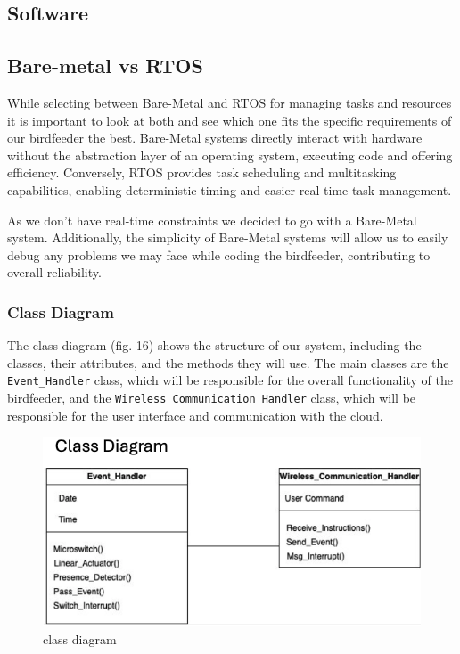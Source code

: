 \documentclass[12pt,a4paper]{article}
\begin{document}
\subsection{Software}
\subsection{Bare-metal vs RTOS}
While selecting between Bare-Metal and RTOS for managing tasks and resources it is important to look at both and see which one fits the specific requirements of our birdfeeder the best. Bare-Metal systems directly interact with hardware without the abstraction layer of an operating system, executing code and offering efficiency. Conversely, RTOS provides task scheduling and multitasking capabilities, enabling deterministic timing and easier real-time task management. 

As we don't have real-time constraints we decided to go with a Bare-Metal system. Additionally, the simplicity of Bare-Metal systems will allow us to easily debug any problems we may face while coding the birdfeeder, contributing to overall reliability. 
\subsubsection{Class Diagram}

The class diagram (fig. 16) shows the structure of our system, including the classes, their attributes, and the methods they will use. The main classes are the \texttt{Event\_Handler} class, which will be responsible for the overall functionality of the birdfeeder, and the \texttt{Wireless\_Communication\_Handler} class, which will be responsible for the user interface and communication with the cloud.

\begin{figure}[h]
    \centering
    \includegraphics[width=1\textwidth]{images/class_diagram.png}
    \caption{class diagram}
\end{figure}
\end{document}
